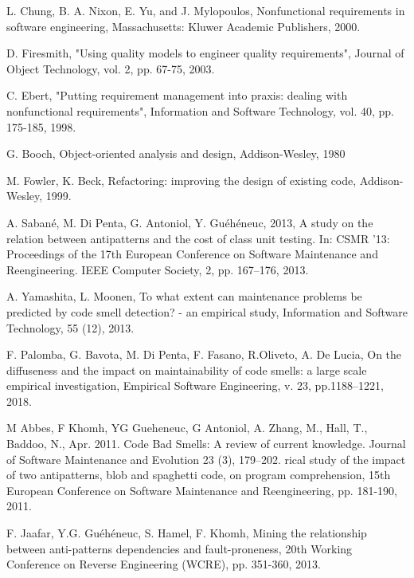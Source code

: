 \documentclass{sigchi}
\begin{document}
\balance{}


\newpage
\begin{thebibliography}{2}
	
	 L. Chung, B. A. Nixon, E. Yu, and J. Mylopoulos, Nonfunctional requirements in software engineering, Massachusetts: Kluwer Academic Publishers, 2000.
	
		D. Firesmith, "Using quality models to engineer quality requirements", Journal of Object Technology, vol. 2, pp. 67-75, 2003. 
	
	 C. Ebert, "Putting requirement management into praxis: dealing with nonfunctional requirements", Information and Software Technology, vol. 40, pp. 175-185, 1998. 
	
	G. Booch, Object-oriented analysis and design, Addison-Wesley, 1980 
	
	M. Fowler, K. Beck, Refactoring: improving the design of existing code, Addison-Wesley, 1999.
	
	 A. Sabané, M. Di Penta, G. Antoniol, Y. Guéhéneuc, 2013, A study on the relation between antipatterns and the cost of class unit testing. In: CSMR ’13: Proceedings of the 17th European Conference on Software Maintenance and Reengineering. IEEE Computer Society, 2, pp. 167–176, 2013.
	
	A. Yamashita, L. Moonen, To what extent can maintenance problems be predicted by code smell detection? - an empirical study, Information and Software Technology, 55 (12), 2013.
	
	 F. Palomba, G. Bavota, M. Di Penta, F. Fasano, R.Oliveto, A. De Lucia, On the diffuseness and the impact on maintainability of code smells: a large scale empirical investigation,  Empirical Software Engineering, v. 23, pp.1188–1221, 2018.
	
		M Abbes, F Khomh, YG Gueheneuc, G Antoniol, A. Zhang, M., Hall, T., Baddoo, N., Apr. 2011. Code Bad Smells: A review of current knowledge. Journal of Software Maintenance and Evolution 23 (3), 179–202. rical study of the impact of two antipatterns, blob and spaghetti code, on program comprehension, 15th European Conference on Software Maintenance and Reengineering, pp. 181-190, 2011.
	
	F. Jaafar, Y.G. Guéhéneuc, S. Hamel, F. Khomh, Mining the relationship between anti-patterns dependencies and fault-proneness, 20th Working Conference on Reverse Engineering (WCRE), pp. 351-360, 2013. 
	

\end{thebibliography}
\end{document}
